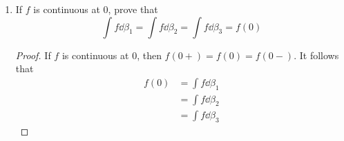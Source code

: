\documentclass[../psets.tex]{subfiles}
\begin{document}
\begin{enumerate}[label={\textbf{\arabic*.}}]
\begin{enumerate}
\begin{proof}
            \begin{align*}
                |f(x)-f(0)| &\leq M_i-m_i\\
                &\leq (M_{i-1}-m_{i-1})+(M_i-m_i)\\
                &= 2\left[ \frac{M_{i-1}+M_i}{2}-\frac{m_{i-1}+m_i}{2} \right]\\
                &= 2[U(P^*,f,\beta_3)-L(P^*,f,\beta_3)]\\
                &< \epsilon
            \end{align*}
            as desired. The proof is symmetric in the other case.\par\medskip
            Now suppose that $f$ is continuous at 0. To prove that $f\in\mathscr{R}(\beta_3)$, Theorem 6.6 tells us that it will suffice to show that for every $\epsilon>0$, there exists a $P$ such that $U(P,f,\beta_3)-L(P,f,\beta_3)<\epsilon$. Let $\epsilon>0$ be arbitrary. Since $f$ is continuous at 0, we know that there exists a $\delta'>0$ such that if $x\in[-1,1]$ and $|x|<\delta'$, then $|f(x)-f(0)|<\epsilon/3$. Choose $\delta=\min(\delta'/2,1)$. Consider $P=\{-1,-\delta/2,\delta/2,1\}$. It follows as before that $U(P,f,\beta_3)=M_2$ and $L(P,f,\beta_3)=m_2$. Consequently, $M_2\leq f(0)+\epsilon/3$ and $m_2\geq f(0)-\epsilon/3$. Therefore,
            \begin{align*}
                U(P,f,\beta_3)-L(P,f,\beta_3) &= M_2-m_2\\
                &\leq [f(0)+\tfrac{\epsilon}{3}]-[f(0)-\tfrac{\epsilon}{3}]\\
                &= \frac{2\epsilon}{3}\\
                &< \epsilon
            \end{align*}
            as desired.
        \end{proof}
        \item If $f$ is continuous at 0, prove that
        \begin{equation*}
            \int f\dd{\beta_1} = \int f\dd{\beta_2}
            = \int f\dd{\beta_3}
            = f(0)
        \end{equation*}
        \begin{proof}
            If $f$ is continuous at 0, then $f(0+)=f(0)=f(0-)$. It follows that
            \begin{align*}
                f(0) &= \int f\dd{\beta_1}\tag*{Part (a)}\\
                &= \int f\dd{\beta_2}\tag*{Part (b)}\\
                &= \int f\dd{\beta_3}\tag*{Part (c)}

\end{align*}
\end{proof}
\end{enumerate}
\end{enumerate}
\end{document}
